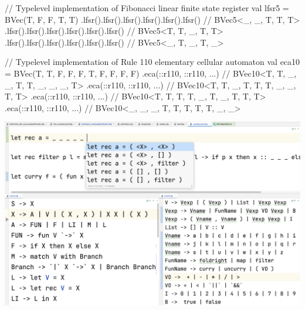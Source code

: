 \documentclass[portrait,a0b,final,a4resizeable]{a0poster}
\def\jointspacing{\vspace{0.3in}}
\begin{document}
\begin{poster}
\begin{multicols}{2}
\begin{minipage}[c]{0.90\columnwidth}
\begin{kotlinlisting}
// Typelevel implementation of Fibonacci linear finite state register
val lfsr5 = BVec(T, F, F, T, T)
   .lfsr().lfsr().lfsr().lfsr().lfsr().lfsr() // BVec5<_, _, T, T, T>
   .lfsr().lfsr().lfsr().lfsr().lfsr().lfsr() // BVec5<T, T, _, T, T>
   .lfsr().lfsr().lfsr().lfsr().lfsr().lfsr() // BVec5<_, T, _, T, _>

// Typelevel implementation of Rule 110 elementary cellular automaton
val eca10 = BVec(T, T, F, F, F, T, F, F, F, F)
   .eca(::r110, ::r110, ...)  // BVec10<T, T, _, _, T, T, _, _, _, T>
   .eca(::r110, ::r110, ...)  // BVec10<T, T, _, T, T, T, _, _, T, T>
   .eca(::r110, ::r110, ...)  // BVec10<T, T, T, T, _, T, _, T, T, T>
   .eca(::r110, ::r110, ...)  // BVec10<_, _, _, T, T, T, T, T, _, _>
\end{kotlinlisting}
      \end{minipage}

      \jointspacing


      \null\hspace*{1.8cm}\begin{minipage}[c]{0.90\columnwidth}
          \href{https://github.com/breandan/tidyparse}{\includegraphics[width=\textwidth]{../figures/tidyparse.png}}
      \end{minipage}

      \jointspacing

    \end{multicols}


\end{poster}
\end{document}
